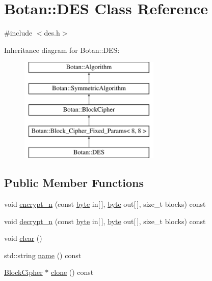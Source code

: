 \hypertarget{classBotan_1_1DES}{\section{Botan\-:\-:D\-E\-S Class Reference}
\label{classBotan_1_1DES}
}


{\ttfamily \#include $<$des.\-h$>$}

Inheritance diagram for Botan\-:\-:D\-E\-S\-:\begin{figure}[H]
\begin{center}
\leavevmode
\includegraphics[height=5.000000cm]{classBotan_1_1DES}
\end{center}
\end{figure}
\subsection*{Public Member Functions}
\begin{DoxyCompactItemize}
\item 
void \hyperlink{classBotan_1_1DES_aae431ce0743b4c4b3b23711208b229d0}{encrypt\-\_\-n} (const \hyperlink{namespaceBotan_a7d793989d801281df48c6b19616b8b84}{byte} in\mbox{[}$\,$\mbox{]}, \hyperlink{namespaceBotan_a7d793989d801281df48c6b19616b8b84}{byte} out\mbox{[}$\,$\mbox{]}, size\-\_\-t blocks) const 
\item 
void \hyperlink{classBotan_1_1DES_a6487cc6376cebe50985bb8947a40cb96}{decrypt\-\_\-n} (const \hyperlink{namespaceBotan_a7d793989d801281df48c6b19616b8b84}{byte} in\mbox{[}$\,$\mbox{]}, \hyperlink{namespaceBotan_a7d793989d801281df48c6b19616b8b84}{byte} out\mbox{[}$\,$\mbox{]}, size\-\_\-t blocks) const 
\item 
void \hyperlink{classBotan_1_1DES_a344ab940509d741e46a1d28bd7f93f30}{clear} ()
\item 
std\-::string \hyperlink{classBotan_1_1DES_aaa86808370621624932b8868158d2dfc}{name} () const 
\item 
\hyperlink{classBotan_1_1BlockCipher}{Block\-Cipher} $\ast$ \hyperlink{classBotan_1_1DES_a5089b7ac40b731ae19a598f166a60720}{clone} () const 
\end{DoxyCompactItemize}

